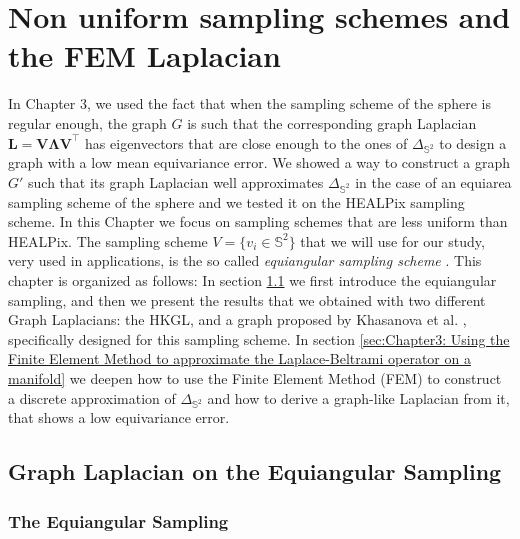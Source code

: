 

\section{Non uniform sampling schemes and the FEM Laplacian}

In Chapter 3, we used the fact that when the sampling scheme of the sphere is regular enough, the graph $G$ is such that the corresponding graph Laplacian $\mathbf {L=V\Lambda V}^\intercal$ has eigenvectors that are close enough to the ones of $\Delta_{\mathbb S^2}$ to design a graph with a low mean equivariance error. We showed a way to construct a graph $G'$ such that its graph Laplacian well approximates $\Delta_{\mathbb S^2}$ in the case of an equiarea sampling scheme of the sphere and we tested it on the HEALPix sampling scheme. In this Chapter we focus on sampling schemes that are less uniform than HEALPix. The sampling scheme $V=\{v_i\in \mathbb S^2\}$ that we will use for our study, very used in applications, is the so called \textit{equiangular sampling scheme} \cite{Driscoll:1994:CFT:184069.184073}. 
This chapter is organized as follows: In section \ref{sec:Chapter3: Heat Kernel Graph Laplacian on the Equiangular Sampling} we first introduce the equiangular sampling, and then we present the results that we obtained with two different Graph Laplacians: the HKGL, and a graph proposed by Khasanova et al. \cite{Frossard2017GraphBasedCO}, specifically designed for this sampling scheme. In section \ref{sec:Chapter3: Using the Finite Element Method to approximate the Laplace-Beltrami operator on a manifold} we deepen how to use the Finite Element Method (FEM) to construct a discrete approximation of $\Delta _{\mathbb S^2}$ and how to derive a graph-like Laplacian from it, that shows a low equivariance error.
\subsection{Graph Laplacian on the Equiangular Sampling}
\label{sec:Chapter3: Heat Kernel Graph Laplacian on the Equiangular Sampling}

\subsubsection{The Equiangular Sampling}

